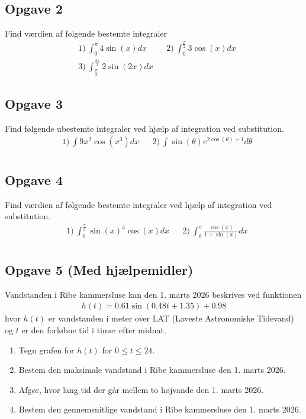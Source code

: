 \subsection*{Opgave 2}
Find værdien af følgende bestemte integraler
\begin{align*}
	&1) \  \int_0^{\pi}	4\sin(x) dx   &&2) \  \int_0^{\frac{\pi}{2}} 3\cos(x) dx  \\
	&3) \  \int_{\frac{\pi}{3}}^{\frac{2\pi}{3}} 2\sin(2x) dx  
\end{align*}

\subsection*{Opgave 3}
Find følgende ubestemte integraler ved hjælp af integration ved substitution.
\begin{align*}
	&1) \ \int 9x^2\cos(x^3) dx   &&2) \  \int \sin(\theta)e^{2\cos(\theta) + 1} d\theta  \\
\end{align*}

\subsection*{Opgave 4}

Find værdien af følgende bestemte integraler ved hjælp af integration ved substitution.
\begin{align*}
	&1) \  \int_0^{\frac{\pi}{2}} \sin(x)^3\cos(x) dx   &&2) \  \int_{0}^{\pi} \frac{\cos(x)}{1 + \sin(x)} dx  \\
\end{align*}

\subsection*{Opgave 5 (Med hjælpemidler)}

Vandstanden i Ribe kammersluse kan den 1. marts 2026 beskrives ved funktionen 
\begin{align*}
	h(t) = 0.61\sin(0.48t + 1.35) + 0.98
\end{align*}
hvor $h(t)$ er vandstanden i meter over LAT (Laveste Astronomiske Tidevand) og $t$ er den forløbne tid i timer efter midnat.

\begin{enumerate}[label = \roman*)]
	\item Tegn grafen for $h(t)$ for $0 \leq t \leq 24$.
	\item Bestem den maksimale vandstand i Ribe kammersluse den 1. marts 2026.
	\item Afgør, hvor lang tid der går mellem to højvande den 1. marts 2026.
	\item Bestem den gennemsnitlige vandstand i Ribe kammersluse den 1. marts 2026.
\end{enumerate}

